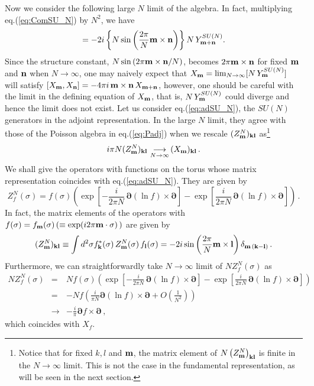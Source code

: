 \documentclass[a4paper,12pt]{article}
\newcommand{\nn}{\nonumber\\}
\begin{document}
Now we consider the following large $N$ limit of the algebra.
In fact, multiplying eq.(\ref{eq:ComSU_N}) by $N^2$, we have
\begin{equation}
 [\,N\,Y^{SU(N)}_{\bf m}, N\,Y^{SU(N)}_{\bf n}\,]
  =-2i \left\{ N\sin\left(\frac{2\pi}{N}{\bf m\times n}\right)\right\}
  N\,Y^{SU(N)}_{\bf m+n}. \label{eq:NComSU_N}
\end{equation}
Since the structure constant,
$N\sin\left(2\pi{\bf m\times n}/N\right)$, becomes
$2\pi{\bf m\times n}$ for fixed ${\bf m}$ and ${\bf n}$ when
$N\to\infty$, one may naively expect that $X_{\bf m} = 
\lim_{N\to\infty}[N\,Y^{SU(N)}_{\bf m}]$ will satisfy $[X_{\bf
m},X_{\bf n}]= -4\pi i\,{\bf m\times n}\,X_{\bf m+n}$, however, one
should be careful with the limit in the defining equation of
$X_{\bf m}$, that is, $N\,Y^{SU(N)}_{\bf m}$ could diverge and hence
the limit does not exist.
Let us consider eq.(\ref{eq:adSU_N}), the $SU(N)$ generators in the
adjoint representation.
In the large $N$ limit, they agree with those of the Poisson algebra
in eq.(\ref{eq:Padj}) when we rescale $(Z^{N}_{\bf m})_{\bf kl}$
as\footnote{Notice that for fixed $k,l$ and ${\bf m}$, the matrix
element of $N\left(Z^{N}_{\bf m}\right)_{\bf kl}$ is finite in
the $N\to\infty$ limit. This is not the case in the fundamental
representation, as will be seen in the next section.}
\begin{equation}
 i\pi N(Z^{N}_{\bf m})_{\bf kl}\,
  \mathop{\longrightarrow}_{N\rightarrow\infty}\,
  (X_{\bf m})_{\bf kl}\,. \label{eq:ad-infty}
\end{equation}
We shall give the operators with functions on the torus whose matrix
representation coincides with eq.(\ref{eq:adSU_N}).
They are given by
\begin{equation}
  Z^{N}_f(\sigma) = f(\sigma) \left(
    \exp\left[-\frac{i}{2\pi N}\,{\bm\partial}
	 (\ln{f})\times {\bm\partial}\right]
    - \exp\left[\frac{i}{2\pi N}\,{\bm\partial}
    (\ln{f})\times {\bm\partial}\right]\right)\,.
\end{equation}
In fact, the matrix elements of the operators with
$f(\sigma)=f_{\bf m}(\sigma)\,(\equiv\exp(i2\pi{\bf m}\cdot\sigma)\,)$
are given by
\begin{equation}
 (Z^{N}_{\bf m})_{\bf k l} \equiv
  \int d^2\sigma f^*_{\bf k}(\sigma)\,Z^{N}_{\bf m}(\sigma)\,
  f_{\bf l}(\sigma)
  =-2i\sin\left(\frac{2\pi}{N}{\bf m\times l}\right)\delta_{{\bf
  m}\,({\bf k-l})}\,. \label{eq:AdMatrix}
\end{equation}
Furthermore, we can straightforwardly take $N\rightarrow\infty$ limit
of $N Z^{N}_f(\sigma)$ as
\begin{eqnarray}
  N Z^{N}_f(\sigma) &= &N f(\sigma) \left(
    \exp\left[-\frac{i}{2\pi N}\,{\bm\partial}
	 (\ln{f})\times {\bm\partial}\right]
    - \exp\left[\frac{i}{2\pi N}\,{\bm\partial}
    (\ln{f})\times {\bm\partial}\right]\right)\nn
  &=& -N f \left( \frac{i}{\pi N}{\bm\partial}
	 (\ln{f})\times {\bm\partial} +
    O(\frac{1}{N^2})\right)\nn
  &\rightarrow& -\frac{i}{\pi}{\bm\partial} f\times {\bm\partial}\,,
\end{eqnarray}
which coincides with $X_f$.
\end{document}
